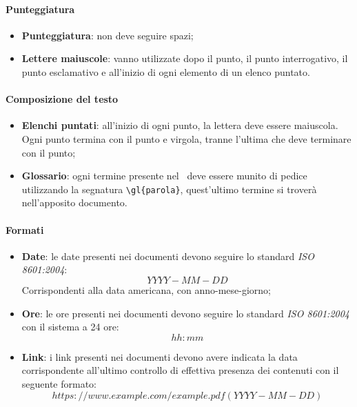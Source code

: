 \documentclass[../NormeDiProgetto.tex]{subfiles}
\begin{document}
\paragraph{Punteggiatura}
\begin{itemize}
  \item \textbf{Punteggiatura}: non deve seguire spazi;
  \item \textbf{Lettere maiuscole}: vanno utilizzate dopo il punto, il punto interrogativo,
  il punto esclamativo e all'inizio di ogni elemento di un elenco puntato.
\end{itemize}

\paragraph{Composizione del testo}
\begin{itemize}
  \item \textbf{Elenchi puntati}: all'inizio di ogni punto, la lettera deve essere maiuscola. Ogni punto termina con il punto e virgola, tranne l'ultima che deve terminare con il punto;
   \item \textbf{Glossario}: ogni termine presente nel \glossario\ deve essere munito di pedice utilizzando la segnatura \verb|\gl{parola}|, quest'ultimo termine si troverà nell'apposito documento.
\end{itemize}

\paragraph{Formati}
\begin{itemize}
   \item \textbf{Date}: le date presenti nei documenti devono seguire lo standard \textit{ISO 8601:2004}:\\
   \begin{equation*}
     YYYY-MM-DD
   \end{equation*}
   Corrispondenti alla data americana, con anno-mese-giorno;
   \item \textbf{Ore}: le ore presenti nei documenti devono seguire lo standard \textit{ISO 8601:2004}
   con il sistema a 24 ore:\\
     \begin{equation*}
     		hh:mm
     \end{equation*}
   \item \textbf{Link}: i link presenti nei documenti devono avere indicata la data corrispondente all'ultimo controllo di effettiva presenza dei contenuti con il seguente formato:\\
   \begin{equation*}
   	https://www.example.com/example.pdf(YYYY-MM-DD)
  	\end{equation*}
\end{itemize}
\end{document}

